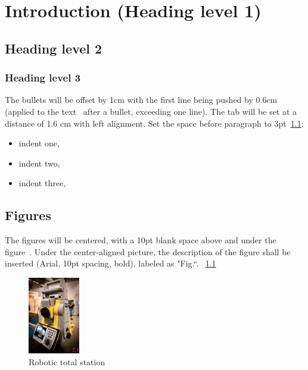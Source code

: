 \chapter{Introduction (Heading level 1)}\label{introduction}
    \section{Heading level 2}\label{sec:level2}
        \subsection{Heading level 3}\label{subsec:level3}
        The bullets will be offset by 1cm with the first line being pushed by 0.6cm
        (applied to the text~\cite{appdesigner} after a bullet, exceeding one line). The tab will be
        set at a distance of 1.6 cm with left alignment. Set the space before paragraph
        to 3pt~\ref{fig:example}:
        \begin{itemize}
            \item indent one,
            \item indent two,
            \item indent three,
        \end{itemize}
    \section{Figures}\label{sec:figures}
    The figures will be centered, with a 10pt blank space above and
    under the figure~\cite{Levinson}. Under the center-aligned picture, the description
    of the figure shall be inserted (Arial, 10pt spacing, bold),
    labeled as "Fig.“. ~\ref{fig:example}
    \begin{center}
        \begin{figure}[!ht]
            \centering
            \includegraphics[width=0.2\textwidth]{figures/example}
            \caption{Robotic total station}
            \label{fig:example}
        \end{figure}
    \end{center}
